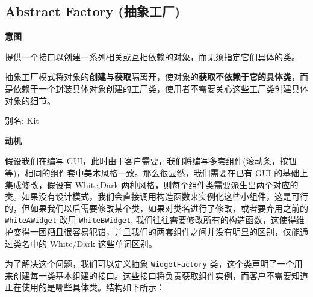 \subsection{Abstract Factory (抽象工厂)}
\noindent\textbf{意图}

提供一个接口以创建一系列相关或互相依赖的对象，而无须指定它们具体的类。

抽象工厂模式将对象的\textbf{创建}与\textbf{获取}隔离开，使对象的\textbf{获取不依赖于它的具体类}，而是依赖于一个封装具体对象创建的工厂类，使用者不需要关心这些工厂类创建具体对象的细节。

别名: Kit

\noindent\textbf{动机}

假设我们在编写 GUI，此时由于客户需要，我们将编写多套组件(滚动条，按钮等)，相同的组件套中美术风格一致。那么很显然，我们需要在已有 GUI 的基础上集成修改，假设有 White,Dark 两种风格，则每个组件类需要派生出两个对应的类。如果没有设计模式，我们会直接调用构造函数来实例化这些小组件，这是可行的，但如果我们以后需要修改某个类，如果对类名进行了修改，或者要弃用之前的 \texttt{WhiteAWidget} 改用 \texttt{WhiteBWidget}, 我们往往需要修改所有的构造函数，这使得维护变得一团糟且很容易犯错，并且我们的两套组件之间并没有明显的区别，仅能通过类名中的 White/Dark 这些单词区别。

为了解决这个问题，我们可以定义抽象 \texttt{WidgetFactory} 类，这个类声明了一个用来创建每一类基本组建的接口。这些接口将负责获取组件实例，而客户不需要知道正在使用的是哪些具体类。结构如下所示：

